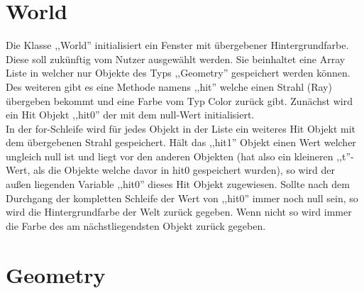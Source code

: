 \documentclass[14pt]{extarticle}
\begin{document}
\section{World}
Die Klasse ,,World'' initialisiert ein Fenster mit übergebener Hintergrundfarbe. Diese soll zukünftig vom Nutzer ausgewählt werden. Sie beinhaltet eine Array Liste in welcher nur Objekte des Typs ,,Geometry'' gespeichert werden können.\\ 
Des weiteren gibt es eine Methode namens ,,hit'' welche einen Strahl (Ray) übergeben bekommt und eine Farbe vom Typ Color zurück gibt. Zunächst wird ein Hit Objekt ,,hit0'' der mit dem null-Wert initialisiert. \\
In der for-Schleife wird für jedes Objekt in der Liste ein weiteres Hit Objekt mit dem übergebenen Strahl gespeichert. Hält das ,,hit1'' Objekt einen Wert welcher ungleich null ist und liegt vor den anderen Objekten (hat also ein kleineren ,,t''-Wert, als die Objekte welche davor in hit0 gespeichert wurden), so wird der außen liegenden Variable ,,hit0'' dieses Hit Objekt zugewiesen. Sollte nach dem Durchgang der kompletten Schleife der Wert von ,,hit0'' immer noch null sein, so wird die Hintergrundfarbe der Welt zurück gegeben. Wenn nicht so wird immer die Farbe des am nächstliegendsten Objekt zurück gegeben. 

\section{Geometry}
\end{document}
